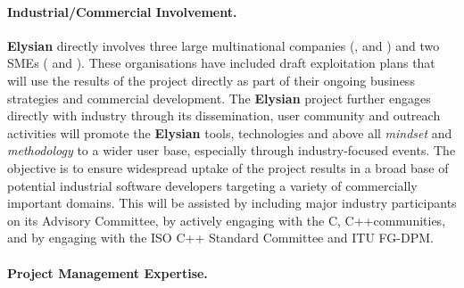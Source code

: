 \documentclass[a4paper,11pt]{article}
\newcommand{\project}[1]{\textbf{#1}\xspace}
\newcommand{\SECURITY}{\project{Elysian}}
\newcommand{\TheProject}{\SECURITY}
\begin{document}
\paragraph{Industrial/Commercial Involvement.}

\TheProject{} directly involves three large multinational companies (\IBMshort{}, \SOPRAshort{} and \FRQshort{}) and
two SMEs (\COGNIshort{} and \YAGshort{}).
These organisations have included draft exploitation plans that will  use the results of the project
directly as part of their ongoing business strategies and commercial development.
The \TheProject{} project further engages directly with industry through its
dissemination, user community and outreach activities 
will promote the
\TheProject{} tools, technologies and above all \emph{mindset} and \emph{methodology} to a wider user base,
especially through industry-focused events. %
The objective is to ensure widespread uptake of the project results in a broad base of potential industrial
software developers targeting a variety of commercially important domains. %
This will be assisted by including major industry participants on its Advisory Committee,
by actively engaging with the C, C++communities, and by engaging with the ISO C++ Standard Committee and ITU FG-DPM.


\paragraph{Project Management Expertise.}
\end{document}
